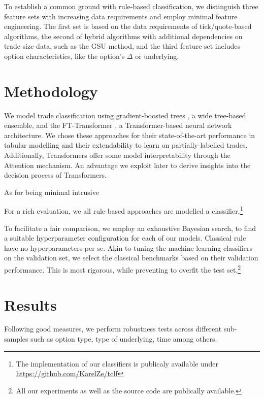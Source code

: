 To establish a common ground with rule-based classification, we distinguish three feature sets with increasing data requirements and employ minimal feature engineering. The first set is based on the data requirements of tick/quote-based algorithms, the second of hybrid algorithms with additional dependencies on trade size data, such as the \gls{GSU} method, and the third feature set includes option characteristics, like the option's $\Delta$ or underlying. 

\section{Methodology}

We model trade classification using gradient-boosted trees \autocites[][]{friedmanGreedyFunctionApproximation2001}, a wide tree-based ensemble, and the FT-Transformer \autocite{gorishniyRevisitingDeepLearning2021}, a Transformer-based neural network architecture. We chose these approaches for their state-of-the-art performance in tabular modelling \autocites[][]{gorishniyRevisitingDeepLearning2021}[][]{grinsztajnWhyTreebasedModels2022} and their extendability to learn on partially-labelled trades. Additionally, Transformers offer some model interpretability through the Attention mechanism. An advantage we exploit later to derive insights into the decision process of Transformers.

As  for being minimal intrusive

For a rich evaluation, we all rule-based approaches are modelled a classifier.\footnote{The implementation of our classifiers is publicaly available under \url{https://github.com/KarelZe/tclf}}

To facilitate a fair comparison, we employ an exhaustive Bayesian search, to find a suitable hyperparameter configuration for each of our models. Classical
rule have no hyperparameters per se. Akin to tuning the machine learning classifiers on the validation set, we select the classical benchmarks based on their validation performance. This is most rigorous, while preventing to overfit the test set.\footnote{All our experiments as well as the source code are publically available.}

\section{Results}

Following good measures, we perform robustness tests across different sub-samples such as option type, type of underlying, time among others. 


